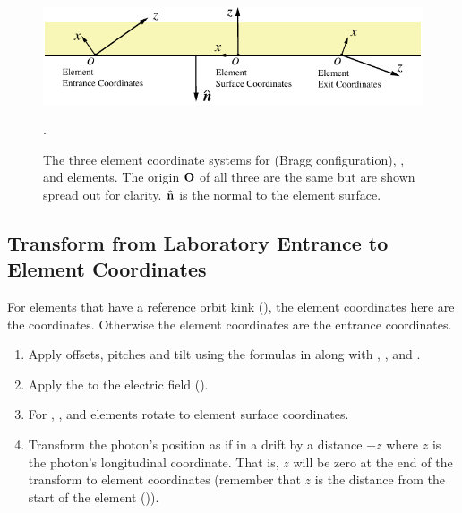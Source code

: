 
\begin{figure}[tb]
  \centering
  \includegraphics[width=5in]{photon-ele-coords.pdf}
  \caption[Crystal, Mirror, and Multilayer_Mirror Element Coordinates.]
{The three element coordinate systems for  (Bragg
configuration), , and  elements.  The
origin ${\bf O}$ of all three are the same but are shown spread out for
clarity.  ${\widehat{\bf n}}$ is the normal to the element surface.}
  \label{f:photon.ele.coords}.
\end{figure}

\subsection{Transform from Laboratory Entrance to Element Coordinates}

For elements that have a reference orbit kink
(), the element coordinates here are the
 coordinates. Otherwise the element coordinates are
the entrance coordinates.

  \begin{enumerate}
  \item
Apply offsets, pitches and tilt using the formulas in
 along with , , and .
  \item
Apply the  to the electric field ().
  \item
For , , and  elements
rotate to element surface coordinates.
 \item
Transform the photon's position as if in a drift by a distance $-z$
where $z$ is the photon's longitudinal coordinate. That is, $z$ will
be zero at the end of the transform to element coordinates (remember
that $z$ is the distance from the start of the element
()).

\end{enumerate}

